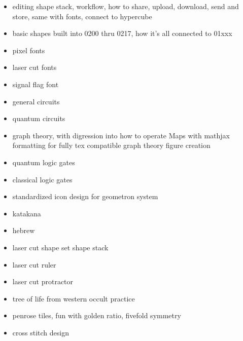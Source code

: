 \begin{itemize}
\tightlist
\item
editing shape stack, workflow, how to share, upload, download, send and store, same with fonts, connect to hypercube
\item
basic shapes built into 0200 thru 0217, how it's all connected to 01xxx
\item
pixel fonts
\item
laser cut fonts
\item
signal flag font
\item
general circuits
\item
quantum circuits
\item
graph theory, with digression into how to operate Maps with mathjax formatting for fully tex compatible graph theory figure creation
\item
quantum logic gates
\item 
classical logic gates
\item
standardized icon design for geometron system
\item
katakana
\item
hebrew
\item
laser cut shape set shape stack
\item
laser cut ruler
\item
laser cut protractor
\item
tree of life from western occult practice
\item
penrose tiles, fun with golden ratio, fivefold symmetry
\item
cross stitch design
\end{itemize}